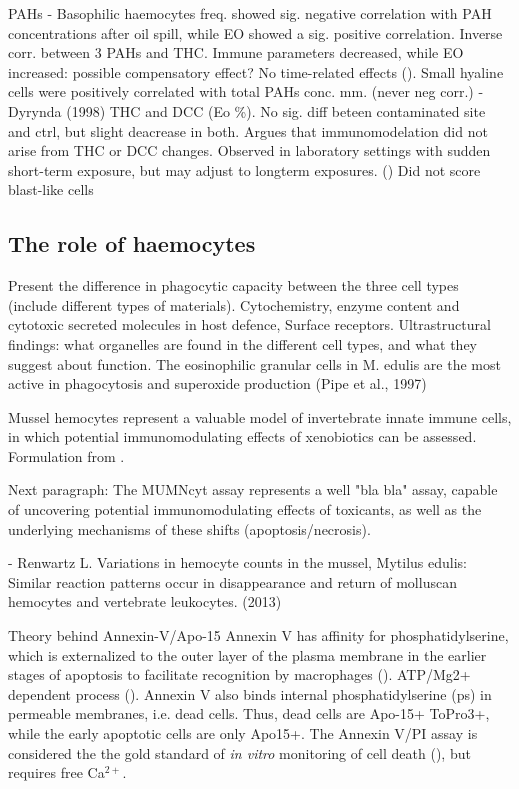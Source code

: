   PAHs
- Basophilic haemocytes freq. showed sig. negative correlation with PAH concentrations after oil spill, while EO showed a sig. positive correlation. Inverse corr. between 3 PAHs and THC. Immune parameters decreased, while EO increased: possible compensatory effect? No time-related effects (\cite{Dyrynda1997}). Small hyaline cells were positively correlated with total PAHs conc. mm. (never neg corr.) %
- Dyrynda (1998) THC and DCC (Eo \%). No sig. diff beteen contaminated site and ctrl, but slight deacrease in both. Argues that immunomodelation did not arise from THC or DCC changes. Observed in laboratory settings with sudden short-term exposure, but may adjust to longterm exposures.  (\cite{Dyrynda1998}) Did not score blast-like cells %

\subsection{The role of haemocytes}
Present the difference in phagocytic capacity between the three cell types (include different types of materials).
Cytochemistry, enzyme content and cytotoxic secreted molecules in host defence, Surface receptors.
Ultrastructural findings: what organelles are found in the different cell types, and what they suggest about function.
The  eosinophilic granular cells in  M. edulis are the most active in phagocytosis and superoxide production (Pipe  et al., 1997)

Mussel hemocytes represent a valuable model of invertebrate innate immune cells, in which potential immunomodulating effects of xenobiotics can be assessed. Formulation from \cite{Rioult2014}.

Next paragraph: The MUMNcyt assay represents a well "bla bla" assay, capable of uncovering potential immunomodulating effects of toxicants, as well as the underlying mechanisms of these shifts (apoptosis/necrosis). 

- Renwartz L. Variations in hemocyte counts in the mussel, Mytilus edulis: Similar reaction patterns occur in disappearance and return of molluscan hemocytes and vertebrate leukocytes. (2013)

Theory behind Annexin-V/Apo-15 Annexin V has affinity for phosphatidylserine, which is externalized to the outer layer of the plasma membrane in the earlier stages of apoptosis to facilitate recognition by macrophages (\cite{Fadok1992}). ATP/Mg2+ dependent process (\cite{Connor1992}). Annexin V also binds internal phosphatidylserine (\acrshort{ps}) in permeable membranes, i.e. dead cells. Thus, dead cells are Apo-15+ ToPro3+, while the early apoptotic cells are only Apo15+. The Annexin V/PI assay is considered the the gold standard of \emph{in vitro} monitoring of cell death (\cite{Jiang2016}), but requires free Ca$^{2+}$.

